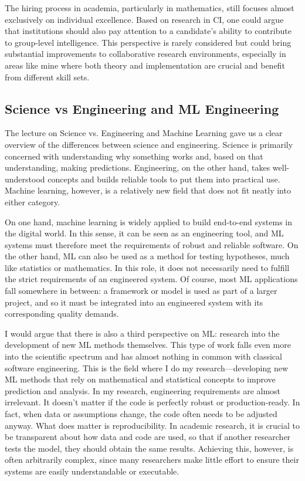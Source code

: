 \documentclass[11pt,a4paper]{article}
\begin{document}
The hiring process in academia, particularly in mathematics, still focuses almost exclusively on individual excellence. Based on research in CI, one could argue that institutions should also pay attention to a candidate’s ability to contribute to group-level intelligence. This perspective is rarely considered but could bring substantial improvements to collaborative research environments, especially in areas like mine where both theory and implementation are crucial and benefit from different skill sets.


\subsection{Science vs Engineering and ML Engineering}
The lecture on Science vs. Engineering and Machine Learning gave us a clear overview of the differences between science and engineering. Science is primarily concerned with understanding why something works and, based on that understanding, making predictions. Engineering, on the other hand, takes well-understood concepts and builds reliable tools to put them into practical use. Machine learning, however, is a relatively new field that does not fit neatly into either category.

On one hand, machine learning is widely applied to build end-to-end systems in the digital world. In this sense, it can be seen as an engineering tool, and ML systems must therefore meet the requirements of robust and reliable software. On the other hand, ML can also be used as a method for testing hypotheses, much like statistics or mathematics. In this role, it does not necessarily need to fulfill the strict requirements of an engineered system. Of course, most ML applications fall somewhere in between: a framework or model is used as part of a larger project, and so it must be integrated into an engineered system with its corresponding quality demands.

I would argue that there is also a third perspective on ML: research into the development of new ML methods themselves. This type of work falls even more into the scientific spectrum and has almost nothing in common with classical software engineering. This is the field where I do my research—developing new ML methods that rely on mathematical and statistical concepts to improve prediction and analysis. In my research, engineering requirements are almost irrelevant. It doesn’t matter if the code is perfectly robust or production-ready. In fact, when data or assumptions change, the code often needs to be adjusted anyway. What does matter is reproducibility. In academic research, it is crucial to be transparent about how data and code are used, so that if another researcher tests the model, they should obtain the same results. Achieving this, however, is often arbitrarily complex, since many researchers make little effort to ensure their systems are easily understandable or executable.
\end{document}
